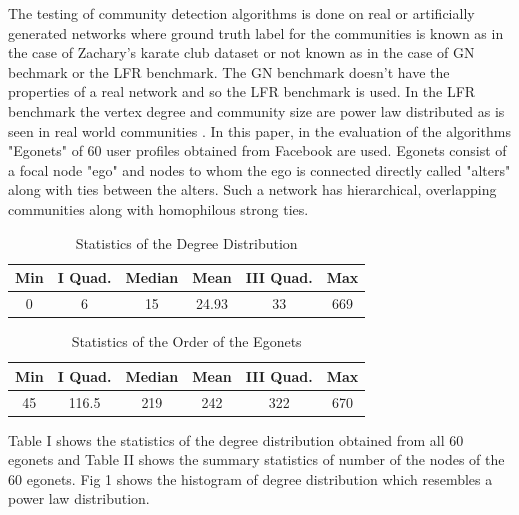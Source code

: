 The testing of community detection algorithms is done on real or artificially generated networks where ground truth label for the communities is known as in the case of Zachary's karate club dataset or not known as in the case of GN bechmark or the LFR benchmark. The GN benchmark doesn't have the properties of a real network and so the LFR benchmark is used. In the LFR benchmark the vertex degree and community size are power law distributed as is seen in real world communities \cite{aps:26}. In this paper, in the evaluation of the algorithms "Egonets" of 60 user profiles obtained from Facebook are used. Egonets consist of a focal node "ego" and nodes to whom the ego is connected directly called "alters" along with ties between the alters. Such a network has hierarchical, overlapping communities along with homophilous strong ties. 


\begin{table}[!h]
\renewcommand{\arraystretch}{1.3}
\caption{Statistics of the Degree Distribution}
\label{table}
\centering
\begin{tabular}{|c|c|c|c|c|c|}
  \hline
\multicolumn{1}{|c|}{\textbf{Min}} & \multicolumn{1}{c|}{\textbf{I Quad.}} & \multicolumn{1}{c|}{\textbf{Median}} & \multicolumn{1}{c|}{\textbf{Mean}} & \multicolumn{1}{c|}{\textbf{III Quad.}} & \multicolumn{1}{c|}{\textbf{Max}}        \\
  \hline
  0 & 6 & 15 & 24.93 & 33 & 669\\
   \hline
\end{tabular}
\end{table}

\begin{table}[!h]
\renewcommand{\arraystretch}{1.3}
\caption{Statistics of the Order of the Egonets}
\label{table}
\centering
\begin{tabular}{|c|c|c|c|c|c|}
  \hline
\multicolumn{1}{|c|}{\textbf{Min}} & \multicolumn{1}{c|}{\textbf{I Quad.}} & \multicolumn{1}{c|}{\textbf{Median}} & \multicolumn{1}{c|}{\textbf{Mean}} & \multicolumn{1}{c|}{\textbf{III Quad.}} & \multicolumn{1}{c|}{\textbf{Max}}        \\
  \hline
  45 & 116.5 & 219 & 242 & 322 & 670\\
   \hline
\end{tabular}
\end{table}

Table I shows the statistics of the degree distribution obtained from all 60 egonets and Table II shows the summary statistics of number of the nodes of the 60 egonets. Fig 1 shows the histogram of degree distribution which resembles a power law distribution.

